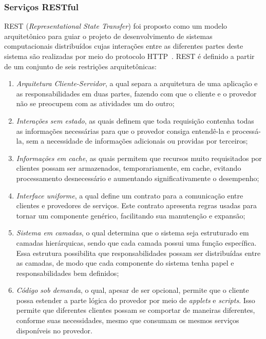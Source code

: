 \subsubsection{Serviços RESTful}\label{2-fundamentacao-dbs-servicos-web-restful}

REST (\textit{Representational State Transfer}) foi proposto como um modelo arquitetônico para guiar o projeto de desenvolvimento de sistemas computacionais distribuídos cujas interações entre as diferentes partes deste sistema são realizadas por meio do protocolo HTTP~\cite{FIELDING-2000-REST, CARDOSO-2006-Semantic-Web-Services}. REST é definido a partir de um conjunto de seis restrições arquitetônicas:

\begin{enumerate}

\item
\textit{Arquitetura Cliente-Servidor}, a qual separa a arquitetura de uma aplicação e as responsabilidades em duas partes, fazendo com que o cliente e o provedor não se preocupem com as atividades um do outro;

\item
\textit{Interações sem estado}, as quais definem que toda requisição contenha todas as informações necessárias para que o provedor consiga entendê-la e processá-la, sem a necessidade de informações adicionais ou providas por terceiros;

\item
\textit{Informações em cache}, as quais permitem que recursos muito requisitados por clientes possam ser armazenados, temporariamente, em cache, evitando processamento desnecessário e aumentando significativamente o desempenho;

\item
\textit{Interface uniforme}, a qual define um contrato para a comunicação entre clientes e provedores de serviços. Este contrato apresenta regras usadas para tornar um componente genérico, facilitando sua manutenção e expansão;

\item
\textit{Sistema em camadas}, o qual determina que o sistema seja estruturado em camadas hierárquicas, sendo que cada camada possui uma função específica. Essa estrutura possibilita que responsabilidades possam ser distribuídas entre as camadas, de modo que cada componente do sistema tenha papel e responsabilidades bem definidos;

\item
\textit{Código sob demanda}, o qual, apesar de ser opcional, permite que o cliente possa estender a parte lógica do provedor por meio de \textit{applets} e \textit{scripts}. Isso permite que diferentes clientes possam se comportar de maneiras diferentes, conforme suas necessidades, mesmo que consumam os mesmos serviços disponíveis no provedor.

\end{enumerate}

